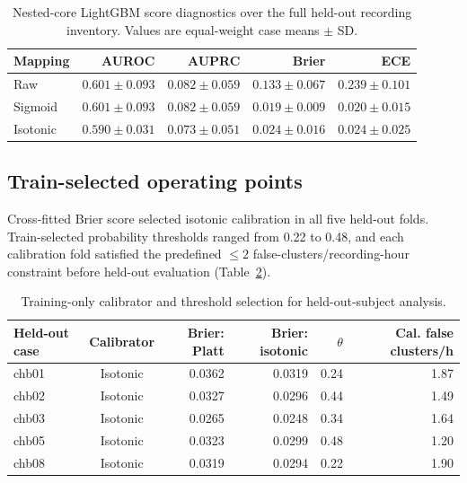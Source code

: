 \documentclass[11pt,a4paper]{article}
\begin{document}
\begin{table}[H]
\centering
\caption{Nested-core LightGBM score diagnostics over the full held-out recording inventory. Values are equal-weight case means $\pm$ SD.}
\label{tab:complete_calibration}
\small
\setlength{\tabcolsep}{4pt}
\begin{tabular}{@{}lrrrr@{}}
\toprule
Mapping & AUROC & AUPRC & Brier & ECE \\
\midrule
Raw & $0.601\pm0.093$ & $0.082\pm0.059$ & $0.133\pm0.067$ & $0.239\pm0.101$ \\
Sigmoid & $0.601\pm0.093$ & $0.082\pm0.059$ & $0.019\pm0.009$ & $0.020\pm0.015$ \\
Isotonic & $0.590\pm0.031$ & $0.073\pm0.051$ & $0.024\pm0.016$ & $0.024\pm0.025$ \\
\bottomrule
\end{tabular}
\end{table}

\subsection{Train-selected operating points}
Cross-fitted Brier score selected isotonic calibration in all five held-out folds. Train-selected probability thresholds ranged from 0.22 to 0.48, and each calibration fold satisfied the predefined $\leq2$ false-clusters/recording-hour constraint before held-out evaluation (Table~\ref{tab:train_selection}).

\begin{table}[H]
\centering
\caption{Training-only calibrator and threshold selection for held-out-subject analysis.}
\label{tab:train_selection}
\scriptsize
\setlength{\tabcolsep}{5pt}
\begin{tabular}{lcrrrr}
\toprule
Held-out case & Calibrator & Brier: Platt & Brier: isotonic & $\theta$ & Cal. false clusters/h \\
\midrule
chb01 & Isotonic & 0.0362 & 0.0319 & 0.24 & 1.87 \\
chb02 & Isotonic & 0.0327 & 0.0296 & 0.44 & 1.49 \\
chb03 & Isotonic & 0.0265 & 0.0248 & 0.34 & 1.64 \\
chb05 & Isotonic & 0.0323 & 0.0299 & 0.48 & 1.20 \\
chb08 & Isotonic & 0.0319 & 0.0294 & 0.22 & 1.90 \\
\bottomrule
\end{tabular}
\end{table}
\end{document}
